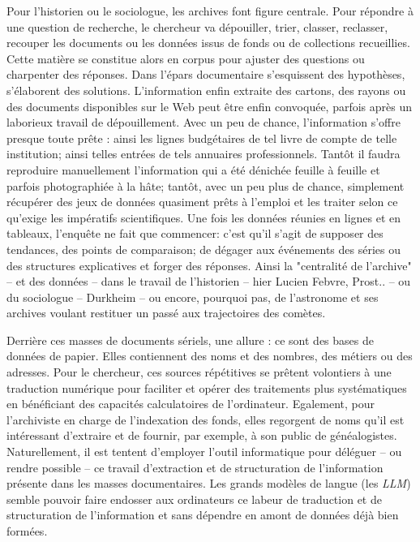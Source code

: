 Pour l'historien ou le sociologue, les archives font figure centrale. Pour répondre à une question de recherche, le chercheur va dépouiller, trier, classer, reclasser, recouper les documents ou les données issus de fonds ou de collections recueillies. Cette matière se constitue alors en corpus pour ajuster des questions ou charpenter des réponses. Dans l'épars documentaire s'esquissent des hypothèses, s'élaborent des solutions. L'information enfin extraite des cartons, des rayons ou des documents disponibles sur le Web peut être enfin convoquée, parfois après un laborieux travail de dépouillement. Avec un peu de chance, l'information s'offre presque toute prête : ainsi les lignes budgétaires de tel livre de compte de telle institution; ainsi telles entrées de tels annuaires professionnels. Tantôt il faudra reproduire manuellement l'information qui a été dénichée feuille à feuille et parfois photographiée à la hâte; tantôt, avec un peu plus de chance, simplement récupérer des jeux de données quasiment prêts à l'emploi et les traiter selon ce qu'exige les impératifs scientifiques. Une fois les données réunies en lignes et en tableaux, l'enquête ne fait que commencer: c'est qu'il s'agit de supposer des tendances, des points de comparaison; de dégager aux événements des séries ou des structures explicatives et forger des réponses. Ainsi la "centralité de l'archive" -- et des données -- dans le travail de l'historien -- hier Lucien Febvre, Prost.. -- ou du sociologue -- Durkheim -- ou encore, pourquoi pas, de l'astronome et ses archives voulant restituer un passé aux trajectoires des comètes. 

Derrière ces masses de documents sériels, une allure : ce sont des bases de données de papier. Elles contiennent des noms et des nombres, des métiers ou des adresses. Pour le chercheur, ces sources répétitives se prêtent volontiers à une traduction numérique pour faciliter et opérer des traitements plus systématiques en bénéficiant des capacités calculatoires de l'ordinateur. Egalement, pour l'archiviste en charge de l'indexation des fonds, elles regorgent de noms qu'il est intéressant d'extraire et de fournir, par exemple, à son public de généalogistes. Naturellement, il est tentent d'employer l'outil informatique pour déléguer -- ou rendre possible -- ce travail d'extraction et de structuration de l'information présente dans les masses documentaires. Les grands modèles de langue (les \textit{LLM}) semble pouvoir faire endosser aux ordinateurs ce labeur de traduction et de structuration de l'information et sans dépendre en amont de données déjà bien formées.

